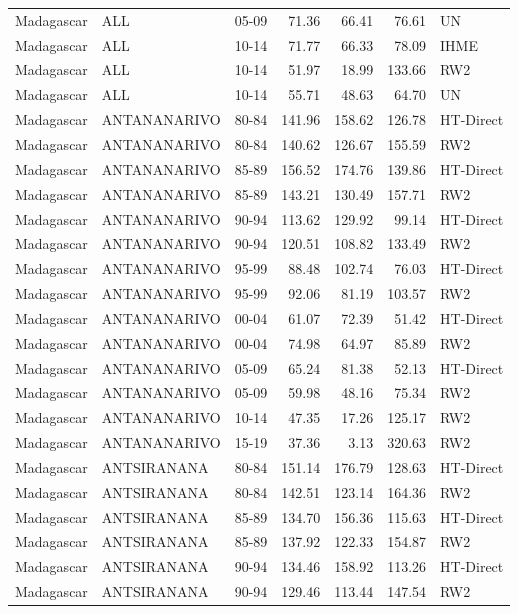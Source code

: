 \begin{longtable}{lllrrrl}
  Madagascar & ALL & 05-09 & 71.36 & 66.41 & 76.61 & UN \\ 
  Madagascar & ALL & 10-14 & 71.77 & 66.33 & 78.09 & IHME \\ 
  Madagascar & ALL & 10-14 & 51.97 & 18.99 & 133.66 & RW2 \\ 
  Madagascar & ALL & 10-14 & 55.71 & 48.63 & 64.70 & UN \\ 
  Madagascar & ANTANANARIVO & 80-84 & 141.96 & 158.62 & 126.78 & HT-Direct \\ 
  Madagascar & ANTANANARIVO & 80-84 & 140.62 & 126.67 & 155.59 & RW2 \\ 
  Madagascar & ANTANANARIVO & 85-89 & 156.52 & 174.76 & 139.86 & HT-Direct \\ 
  Madagascar & ANTANANARIVO & 85-89 & 143.21 & 130.49 & 157.71 & RW2 \\ 
  Madagascar & ANTANANARIVO & 90-94 & 113.62 & 129.92 & 99.14 & HT-Direct \\ 
  Madagascar & ANTANANARIVO & 90-94 & 120.51 & 108.82 & 133.49 & RW2 \\ 
  Madagascar & ANTANANARIVO & 95-99 & 88.48 & 102.74 & 76.03 & HT-Direct \\ 
  Madagascar & ANTANANARIVO & 95-99 & 92.06 & 81.19 & 103.57 & RW2 \\ 
  Madagascar & ANTANANARIVO & 00-04 & 61.07 & 72.39 & 51.42 & HT-Direct \\ 
  Madagascar & ANTANANARIVO & 00-04 & 74.98 & 64.97 & 85.89 & RW2 \\ 
  Madagascar & ANTANANARIVO & 05-09 & 65.24 & 81.38 & 52.13 & HT-Direct \\ 
  Madagascar & ANTANANARIVO & 05-09 & 59.98 & 48.16 & 75.34 & RW2 \\ 
  Madagascar & ANTANANARIVO & 10-14 & 47.35 & 17.26 & 125.17 & RW2 \\ 
  Madagascar & ANTANANARIVO & 15-19 & 37.36 & 3.13 & 320.63 & RW2 \\ 
  Madagascar & ANTSIRANANA & 80-84 & 151.14 & 176.79 & 128.63 & HT-Direct \\ 
  Madagascar & ANTSIRANANA & 80-84 & 142.51 & 123.14 & 164.36 & RW2 \\ 
  Madagascar & ANTSIRANANA & 85-89 & 134.70 & 156.36 & 115.63 & HT-Direct \\ 
  Madagascar & ANTSIRANANA & 85-89 & 137.92 & 122.33 & 154.87 & RW2 \\ 
  Madagascar & ANTSIRANANA & 90-94 & 134.46 & 158.92 & 113.26 & HT-Direct \\ 
  Madagascar & ANTSIRANANA & 90-94 & 129.46 & 113.44 & 147.54 & RW2 \\ 

\end{longtable}
